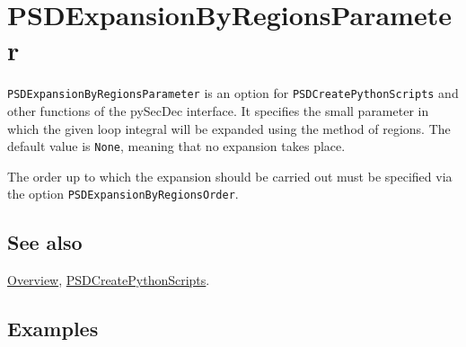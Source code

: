 \documentclass[../FeynHelpersManual.tex]{subfiles}
\begin{document}
\hypertarget{psdexpansionbyregionsparameter}{
\section{PSDExpansionByRegionsParameter}\label{psdexpansionbyregionsparameter}}

\texttt{PSDExpansionByRegionsParameter} is an option for
\texttt{PSDCreatePythonScripts} and other functions of the pySecDec
interface. It specifies the small parameter in which the given loop
integral will be expanded using the method of regions. The default value
is \texttt{None}, meaning that no expansion takes place.

The order up to which the expansion should be carried out must be
specified via the option \texttt{PSDExpansionByRegionsOrder}.

\subsection{See also}

\hyperlink{toc}{Overview},
\hyperlink{psdcreatepythonscripts}{PSDCreatePythonScripts}.

\subsection{Examples}
\end{document}

